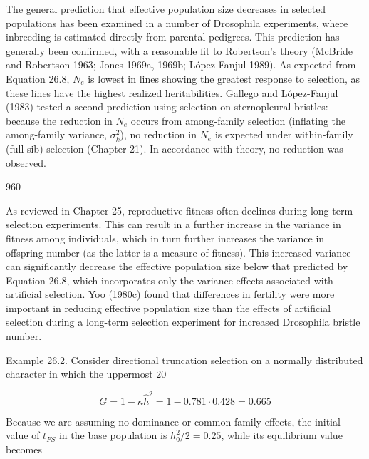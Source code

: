 \documentclass{article}
\begin{document}
The general prediction that effective population size decreases in selected populations has been examined in a number of Drosophila experiments, where inbreeding is estimated directly from parental pedigrees. This prediction has generally been confirmed, with a reasonable fit to Robertson's theory (McBride and Robertson 1963; Jones 1969a, 1969b; López-Fanjul 1989). As expected from Equation 26.8,  $ N_e $ is lowest in lines showing the greatest response to selection, as these lines have the highest realized heritabilities. Gallego and López-Fanjul (1983) tested a second prediction using selection on sternopleural bristles: because the reduction in  $ N_e $ occurs from among-family selection (inflating the among-family variance,  $ \sigma_k^2 $), no reduction in  $ N_e $ is expected under within-family (full-sib) selection (Chapter 21). In accordance with theory, no reduction was observed.

960

As reviewed in Chapter 25, reproductive fitness often declines during long-term selection experiments. This can result in a further increase in the variance in fitness among individuals, which in turn further increases the variance in offspring number (as the latter is a measure of fitness). This increased variance can significantly decrease the effective population size below that predicted by Equation 26.8, which incorporates only the variance effects associated with artificial selection. Yoo (1980c) found that differences in fertility were more important in reducing effective population size than the effects of artificial selection during a long-term selection experiment for increased Drosophila bristle number.

Example 26.2. Consider directional truncation selection on a normally distributed character in which the uppermost 20%

\begin{equation}
G=1-\kappa\widehat{h}^{2}=1-0.781\cdot0.428=0.665
\end{equation}

Because we are assuming no dominance or common-family effects, the initial value of  $ t_{FS} $ in the base population is  $ h_{0}^{2}/2 = 0.25 $, while its equilibrium value becomes
\end{document}
